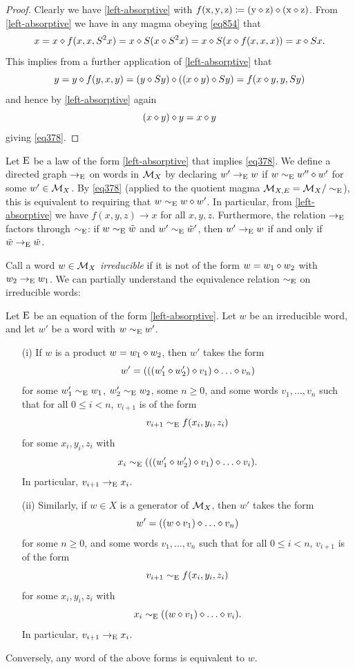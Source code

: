 \begin{proof}  Clearly we have \eqref{left-absorptive} with $f(\mathrm{x},\mathrm{y},\mathrm{z}) \coloneqq (\mathrm{y} \diamond \mathrm{z}) \diamond (\mathrm{x} \diamond \mathrm{z})$.  From \eqref{left-absorptive} we have in any magma obeying \eqref{eq854} that
$$x = x \diamond f(x,x,S^2 x) = x \diamond S(x \diamond S^2 x) = x \diamond S(x \diamond f(x,x,x)) = x \diamond Sx.$$
This implies from a further application of \eqref{left-absorptive} that
$$ y = y \diamond f(y,x,y) = (y \diamond Sy) \diamond ((x \diamond y) \diamond Sy) = f(x \diamond y, y, Sy)$$
and hence by \eqref{left-absorptive} again
$$ (x \diamond y) \diamond y = x \diamond y$$
giving \eqref{eq378}.
\end{proof}

Let $\mathrm{E}$ be a law of the form \eqref{left-absorptive} that implies \eqref{eq378}. We define a directed graph $\to_{\mathrm{E}}$ on words in ${\mathcal{M}}_X$ by declaring $w' \to_{\mathrm{E}} w$ if $w \sim_{\mathrm{E}} w'' \diamond w'$ for some $w' \in {\mathcal{M}}_X$.  By \eqref{eq378} (applied to the quotient magma ${\mathcal{M}}_{X,E} = {\mathcal{M}}_X/\sim_{\mathrm{E}}$), this is equivalent to requiring that $w \sim_{\mathrm{E}} w \diamond w'$. In particular, from \eqref{left-absorptive} we have $f(x,y,z) \to x$ for all $x,y,z$.  Furthermore, the relation $\to_{\mathrm{E}}$ factors through $\sim_{\mathrm{E}}$: if $w \sim_{\mathrm{E}} \tilde w$ and $w' \sim_{\mathrm{E}} \tilde w'$, then $w' \to_{\mathrm{E}} w$ if and only if $\tilde w \to_{\mathrm{E}} \tilde w$.

Call a word $w \in {\mathcal{M}}_X$ \emph{irreducible} if it is not of the form $w = w_1 \diamond w_2$ with $w_2 \to_{\mathrm{E}} w_1$.  We can partially understand the equivalence relation $\sim_{\mathrm{E}}$ on irreducible words:

\begin{theorem}\label{irred-desc}  Let $\mathrm{E}$ be an equation of the form \eqref{left-absorptive}.  Let $w$ be an irreducible word, and let $w'$ be a word with $w \sim_{\mathrm{E}} w'$.
  \begin{itemize}
    \item[(i)] If $w$ is a product $w = w_1 \diamond w_2$, then $w'$ takes the form
$$ w' = (((w'_1 \op w'_2) \op v_1) \op \dots \op v_n)$$
for some $w'_1 \sim_{\mathrm{E}} w_1$, $w'_2 \sim_{\mathrm{E}} w_2$, some $n \geq 0$, and some words $v_1, \dots, v_n$ such that for all $0 \leq i < n$, $v_{i+1}$ is of the form
$$ v_{i+1} \sim_{\mathrm{E}} f(x_i,y_i,z_i)$$
for some $x_i, y_i, z_i$ with
$$ x_i \sim_\E (((w'_1 \op w'_2) \op v_1) \op \dots \op v_i).$$
In particular, $v_{i+1} \to_{\mathrm{E}} x_i$.
  \item[(ii)] Similarly, if $w \in X$ is a generator of ${\mathcal{M}}_X$, then $w'$ takes the form
$$ w' = ((w \op v_1) \op \dots \op v_n)$$
for some $n \geq 0$, and some words $v_1, \dots, v_n$ such that for all $0 \leq i < n$, $v_{i+1}$ is of the form
$$ v_{i+1} \sim_{\mathrm{E}} f(x_i,y_i,z_i)$$
for some $x_i, y_i, z_i$ with
$$ x_i \sim_\E ((w \op v_1) \op \dots \op v_i).$$
In particular, $v_{i+1} \to_{\mathrm{E}} x_i$.
\end{itemize}
Conversely, any word of the above forms is equivalent to $w$.
\end{theorem}

